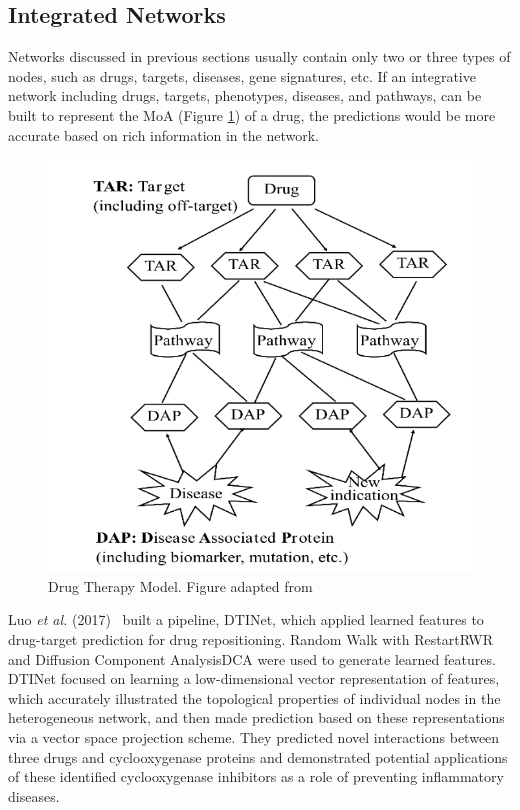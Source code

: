 \subsection{Integrated Networks}

Networks discussed in previous sections usually contain only two or three types of nodes, such as drugs, targets, diseases, gene signatures, etc. If an integrative network including drugs, targets, phenotypes, diseases, and pathways, can be built to represent the \ac{MoA} (Figure \ref{fig:drug_thrapy_model}) of a drug, the predictions would be more accurate based on rich information in the network.

\begin{figure}[!h]
    \centering
    \includegraphics[scale=0.35]
    {figures/drug_therapy_model.png}
    \captionsetup{justification=centering}
    \caption[Drug Therapy Model]{\label{fig:drug_thrapy_model} Drug Therapy Model. Figure adapted from~\cite{ye_drug_2016}}
\end{figure}

Luo \textit{et al.} (2017)~\cite{luo_network_2017} built a pipeline, DTINet, which applied learned features to drug-target prediction for drug repositioning. Random Walk with Restart\ac{RWR} and Diffusion Component Analysis\ac{DCA} were used to generate learned features. DTINet focused on learning a low-dimensional vector representation of features, which accurately illustrated the topological properties of individual nodes in the heterogeneous network, and then made prediction based on these representations via a vector space projection scheme. They predicted novel interactions between three drugs and cyclooxygenase proteins and demonstrated potential applications of these identified cyclooxygenase inhibitors as a role of preventing inflammatory diseases.

